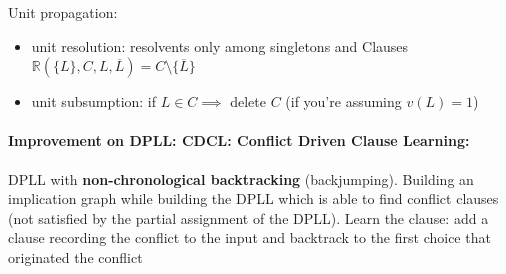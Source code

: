 \noindent
Unit propagation:
\begin{itemize}
	\item unit resolution: resolvents only among singletons and Clauses $\mathbb{R} (\{L\}, C, L, \overline L) = C \setminus \{\overline{L}\}$
	\item unit subsumption: if $L \in C \implies$ delete $C$ (if you're assuming $v(L) = 1$)
\end{itemize}

\paragraph{Improvement on DPLL: CDCL: Conflict Driven Clause Learning:} DPLL with \textbf{non-chronological backtracking} (backjumping). Building an implication graph while building the DPLL which is able to find conflict clauses (not satisfied by the partial assignment of the DPLL). Learn the clause: add a clause recording the conflict to the input and backtrack to the first choice that originated the conflict

\newpage


